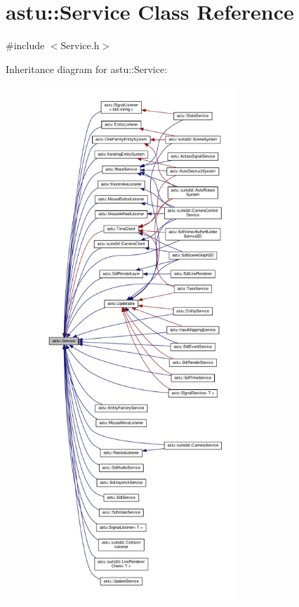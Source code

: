 \hypertarget{classastu_1_1Service}{}\section{astu\+:\+:Service Class Reference}
\label{classastu_1_1Service}


{\ttfamily \#include $<$Service.\+h$>$}



Inheritance diagram for astu\+:\+:Service\+:
\nopagebreak
\begin{figure}[H]
\begin{center}
\leavevmode
\includegraphics[height=550pt]{classastu_1_1Service__inherit__graph}
\end{center}
\end{figure}


